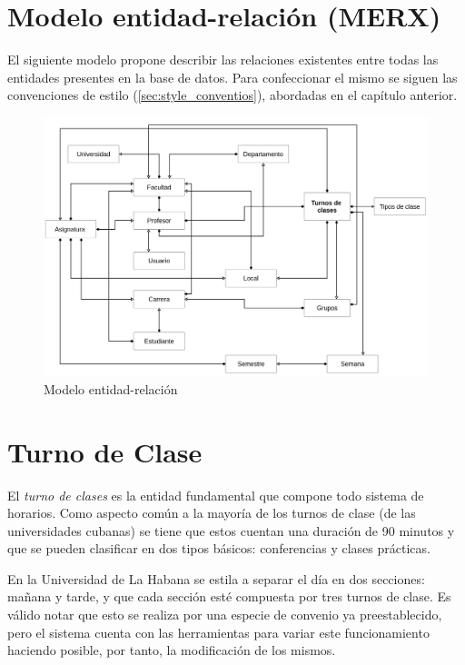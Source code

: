 \section{Modelo entidad-relación (MERX)}

El siguiente modelo propone describir las relaciones existentes entre todas las entidades presentes en la base de datos. Para confeccionar el mismo se siguen las convenciones de estilo (\ref{sec:style_conventios}), abordadas en el capítulo anterior.


\begin{figure}[h!]
	\centering
	\includegraphics[width=1\linewidth]{images/Chapter 2/MERX}
	\caption{ Modelo entidad-relación }
	\label{fig:merx}
\end{figure}


\section{Turno de Clase}
\label{sec:classes}

El \textit{turno de clases} es la entidad fundamental que compone todo sistema de horarios. Como aspecto común a la mayoría de los turnos de clase (de las universidades cubanas) se tiene que estos cuentan una duración de 90 minutos y que se pueden clasificar en dos tipos básicos: conferencias y clases prácticas.

En la Universidad de La Habana se estila a separar el día en dos secciones: mañana y tarde, y que cada sección esté compuesta por tres turnos de clase. Es válido notar que esto se realiza por una especie de convenio ya preestablecido, pero el sistema cuenta con las herramientas para variar este funcionamiento haciendo posible, por tanto, la modificación de los mismos. 

